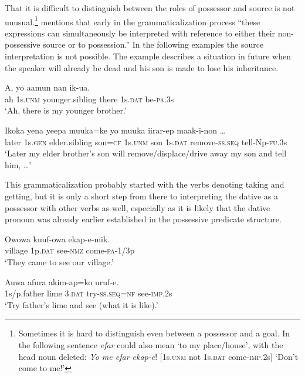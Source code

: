 That it is difficult to distinguish between the roles of possessor and source is not unusual.\footnote{Sometimes it is hard to distinguish even between a possessor and a goal. In the following sentence \textit{efar} could also mean `to my place/house', with the head noun deleted: \textit{Yo me efar ekap-e}! [1s.\textsc{unm} not 1s.\textsc{dat} come-\textsc{imp}.2s] `Don't come to me!' } \citet[133]{Heine1997} mentions that early in the grammaticalization process ``these expressions can simultaneously be interpreted with reference to either their non-possessive source or to possession.'' In the following examples the source interpretation is not possible. The example  describes a situation in future when the speaker will already be dead and his son is made to lose his inheritance.

\ea%
\label{ex:3:x1861}
\gll A, yo aamun nan  ik-ua. \\
ah 1s.\textsc{unm} younger.sibling there 1s.\textsc{dat} be-\textsc{pa}.3s\\
\glt`Ah, there is my younger brother.'
\z

\ea%
\label{ex:3:x1862}
\gll Ikoka yena yeepa muuka=ke yo muuka  iirar-ep maak-i-non {\dots}\\
later 1s.\textsc{gen} elder.sibling son=\textsc{cf} 1s.\textsc{unm} son 1s.\textsc{dat} remove-\textsc{ss}.\textsc{seq} tell-Np-\textsc{fu}.3s\\
\glt`Later my elder brother's son will remove/displace/drive away my son and tell him, {\dots}'
\z

This grammaticalization probably started with the verbs denoting taking and getting, but it is only a short step from there to interpreting the dative as a possessor with other verbs as well, especially as it is likely that the dative pronoun was already earlier established in the possessive predicate structure. 

\ea%
\label{ex:3:x1789}
\gll Owowa  kuuf-owa ekap-e-mik. \\
village 1p.\textsc{dat} see-\textsc{nmz} come-\textsc{pa}-1/3p\\
\glt`They came to see our village.'
\z

\ea%
\label{ex:3:x1791}
\gll Auwa afura  akim-ap=ko uruf-e. \\
1s/p.father lime 3.\textsc{dat} try-\textsc{ss}.\textsc{seq}=\textsc{nf} see-\textsc{imp}.2s\\
\glt`Try father's lime and see (what it is like).'
\z

